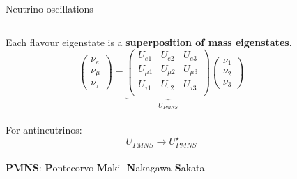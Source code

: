 \begin{frame}{Neutrino oscillations}

\begin{columns}
 \begin{column}{0.50\textwidth}
  Each flavour eigenstate is a {\bf superposition of mass eigenstates}.
  \begin{equation}
   \nonumber
   \begin{pmatrix}
    \nu_{e}\\ \nu_{\mu}\\ \nu_{\tau}
   \end{pmatrix}
   =
   \underbrace{
   \begin{pmatrix}
     U_{e1} & U_{e2} & U_{e3} \\
     U_{\mu1} & U_{\mu2} & U_{\mu3} \\
     U_{\tau1} & U_{\tau2} & U_{\tau3} \\
   \end{pmatrix}
   }_\text{$U_{PMNS}$}
   \begin{pmatrix}
    \nu_{1}\\ \nu_{2}\\ \nu_{3}
   \end{pmatrix}
  \end{equation}\\
  \vspace{0.3cm}
   For antineutrinos:
  \begin{equation}
   \nonumber
   U_{PMNS} \rightarrow U^{\star}_{PMNS}
  \end{equation}\\
  {\scriptsize \color{magenta} {\bf PMNS}: {\bf P}ontecorvo-{\bf M}aki-{\bf
      N}akagawa-{\bf S}akata}
 \end{column}
 \begin{column}{0.50\textwidth}
   \begin{center}
   \vspace{0.3cm}

\end{center}
\end{column}
\end{columns}
\end{frame}
